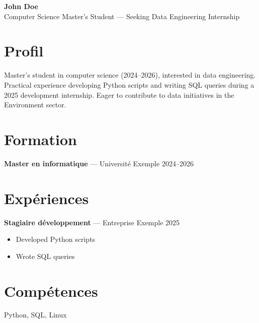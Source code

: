 \documentclass[11pt,a4paper]{article}
\begin{document}
\begin{center}
{\LARGE\bfseries John Doe }\\[3pt]
Computer Science Master's Student — Seeking Data Engineering Internship
\end{center}

\section*{Profil}
Master's student in computer science (2024–2026), interested in data engineering. Practical experience developing Python scripts and writing SQL queries during a 2025 development internship. Eager to contribute to data initiatives in the Environment sector.

\section*{Formation}

\textbf{Master en informatique} --- Université Exemple \hfill 2024–2026\par


\section*{Expériences}

\textbf{Stagiaire développement} --- Entreprise Exemple \hfill 2025\par
\begin{itemize}

\item Developed Python scripts

\item Wrote SQL queries

\end{itemize}


\section*{Compétences}
Python, SQL, Linux
\end{document}
